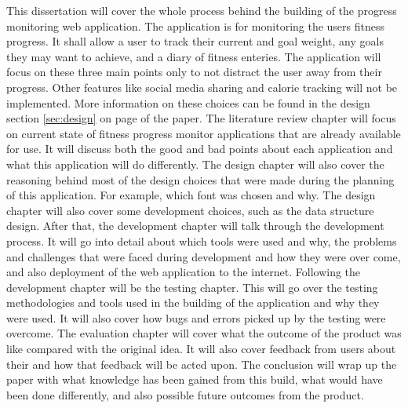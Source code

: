 This dissertation will cover the whole process behind the building of the progress monitoring web application. The application is for monitoring the users fitness progress. It shall allow a user to track their current and goal weight, any goals they may want to achieve, and a diary of fitness enteries. The application will focus on these three main points only to not distract the user away from their progress. Other features like social media sharing and calorie tracking will not be implemented. More information on these choices can be found in the design section \ref{sec:design} on page \pageref{sec:design} of the paper. The literature review chapter will focus on current state of fitness progress monitor applications that are already available for use. It will discuss both the good and bad points about each application and what this application will do differently. The design chapter will also cover the reasoning behind most of the design choices that were made during the planning of this application. For example, which font was chosen and why. The design chapter will also cover some development choices, such as the data structure design. After that, the development chapter will talk through the development process. It will go into detail about which tools were used and why, the problems and challenges that were faced during development and how they were over come, and also deployment of the web application to the internet. Following the development chapter will be the testing chapter. This will go over the testing methodologies and tools used in the building of the application and why they were used. It will also cover how bugs and errors picked up by the testing were overcome. The evaluation chapter will cover what the outcome of the product was like compared with the original idea. It will also cover feedback from users about their and how that feedback will be acted upon. The conclusion will wrap up the paper with what knowledge has been gained from this build, what would have been done differently, and also possible future outcomes from the product.